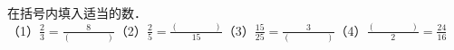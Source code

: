 
在括号内填入适当的数．\\
（1）$\frac{2}{3}=\frac{8}{(\hspace{4em})}$（2）$\frac{2}{5}=\frac{(\hspace{4em})}{15}$（3）$\frac{15}{25}=\frac{3}{(\hspace{4em})}$（4）$\frac{(\hspace{4em})}{2}=\frac{24}{16}$
